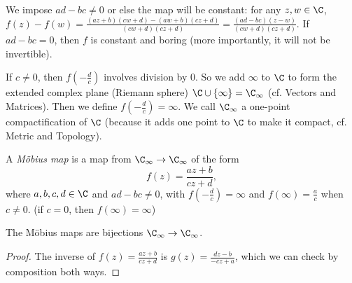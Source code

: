 \documentclass[a4paper]{article}
\begin{document}
We impose $ad - bc\not= 0$ or else the map will be constant: for any $z, w\in \C$, $f(z) - f(w) = \frac{(az + b)(cw + d) - (aw + b)(cz + d)}{(cw + d)(cz + d)} = \frac{(ad - bc)(z - w)}{(cw + d)(cz + d)}$. If $ad - bc = 0$, then $f$ is constant and boring (more importantly, it will not be invertible).

If $c\not=0$, then $f(-\frac{d}{c})$ involves division by 0. So we add $\infty$ to $\C$ to form the extended complex plane (Riemann sphere) $\C\cup \{\infty\}= \C_\infty$ (cf. Vectors and Matrices). Then we define $f(-\frac{d}{c}) = \infty$. We call $\C_\infty$ a one-point compactification of $\C$ (because it adds one point to $\C$ to make it compact, cf. Metric and Topology).

\begin{defi}
  A \emph{M\"obius map} is a map from $\C_\infty \to \C_\infty$ of the form
  \[
    f(z) = \frac{az + b}{cz + d},
  \]
  where $a, b, c, d\in \C$ and $ad - bc\not= 0$, with $f(-\frac{d}{c}) = \infty$ and $f(\infty) = \frac{a}{c}$ when $c\not= 0$. (if $c = 0$, then $f(\infty)=\infty$)
\end{defi}

\begin{lemma}
  The M\"obius maps are bijections $\C_\infty \to \C_\infty$.
\end{lemma}

\begin{proof}
  The inverse of $f(z) = \frac{az + b}{cz+ d}$ is $g(z) = \frac{dz - b}{-cz + a}$, which we can check by composition both ways.
\end{proof}
\end{document}
